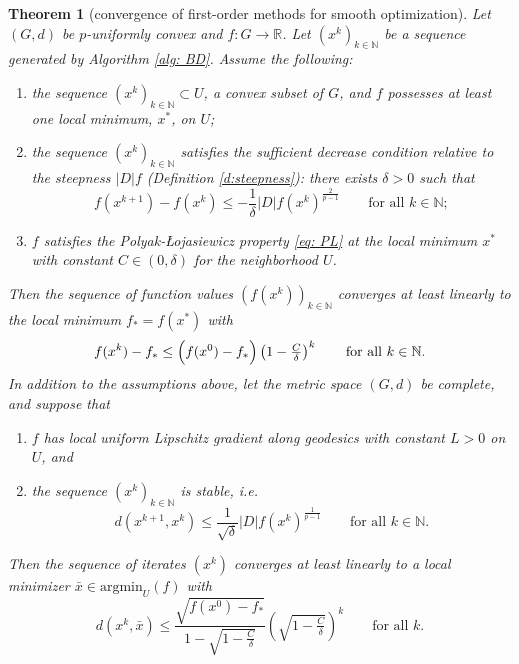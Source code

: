 \documentclass{article}
\theoremstyle{plain}\newtheorem{theorem}{Theorem}[section]
\theoremstyle{plain}\newtheorem{definition}[theorem]{Definition}
\theoremstyle{plain}\newtheorem{lemma}[theorem]{Lemma}
\theoremstyle{definition}\newtheorem{remark}[theorem]{Remark}
\theoremstyle{definition}\newtheorem{example}[theorem]{Example}
\theoremstyle{plain}\newtheorem{proposition}[theorem]{Proposition}
\theoremstyle{plain}\newtheorem{inference}[theorem]{Inference}
\theoremstyle{plain}\newtheorem{corollary}[theorem]{Corollary}
\theoremstyle{plain}\newtheorem{assumption}[theorem]{Assumption}
\newcommand{\xbar}{\bar{x}}
\newcommand{\bbN}{\mathbb{N}}
\begin{document}
\begin{theorem}[convergence of first-order methods for smooth optimization]\label{th: main summary 2}
    Let $(G,d)$ be $p$-uniformly convex and $f:G\to\mathbb{R}$. Let $(x^k)_{k\in\bbN}$ be a sequence generated by Algorithm \ref{alg: BD}. Assume the following:
    \begin{enumerate}
        \item[(a)] the sequence $(x^k)_{k\in\bbN}\subset U$, a convex subset of $G$, and $f$ possesses at least one local minimum, $x^*$, on $U$;
        \item[(b)] the sequence $(x^k)_{k\in\bbN}$ satisfies the {\em sufficient decrease condition} relative to the steepness $|D|f$ (Definition \ref{d:steepness}): there exists $\delta>0$ such that
        \begin{equation}\label{eq: BD assm suff descent}
            f(x^{k+1})-f(x^k)\leq-\frac{1}{\delta}|D|f(x^k)^{\frac{2}{p-1}} \qquad\text{for all}\,\,k\in\bbN;
        \end{equation}
        \item[(c)] $f$ satisfies the Polyak-Łojasiewicz property \eqref{eq: PL} at the local minimum $x^*$ with constant $C\in(0,\delta)$ for the neighborhood $U$.
    \end{enumerate}
    Then the sequence of function values $(f(x^k))_{k\in\bbN}$ converges at least linearly to the local minimum $f_*=f(x^*)$ with
    $$
    f(x^k)-f_*\leq\Bigl(f(x^0)-f_*\Bigr)\left(1-\tfrac{C}{\delta}\right)^k \qquad\text{for all}\,\,k\in\bbN.
    $$
    In addition to the assumptions above, let the metric space $(G,d)$ be complete, and suppose that
    \begin{enumerate}
        \item[(d)] $f$ has local uniform Lipschitz gradient along geodesics with constant $L>0$ on $U$, and
        \item[(e)] the sequence $(x^k)_{k\in\bbN}$ is stable, i.e.
        \begin{equation}\label{e:suff iterate descent}
            d(x^{k+1},x^k)\leq\frac{1}{\sqrt{\delta}}|D|f(x^k)^{\frac{1}{p-1}} \qquad\text{for all}\,\,k\in\bbN.
        \end{equation}
    \end{enumerate}
    Then the sequence of iterates $(x^k)$ converges at least linearly to a local minimizer $\xbar\in\mathrm{argmin}_U(f)$ with
    $$
    d(x^k,\xbar)\leq\frac{\sqrt{f(x^0)-f_*}}{1-\sqrt{1-\tfrac{C}{\delta}}}\left(\sqrt{1-\tfrac{C}{\delta}}\right)^{k} \qquad\text{for all}\,\,k.
    $$
\end{theorem}
\end{document}

